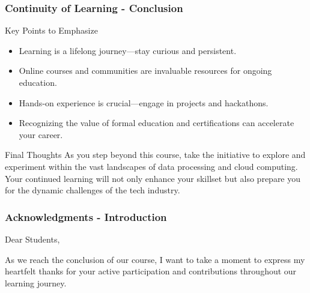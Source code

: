 \documentclass[aspectratio=169]{beamer}
\begin{document}
\begin{frame}[fragile]
    \frametitle{Continuity of Learning - Conclusion}
    \begin{block}{Key Points to Emphasize}
        \begin{itemize}
            \item Learning is a lifelong journey—stay curious and persistent.
            \item Online courses and communities are invaluable resources for ongoing education.
            \item Hands-on experience is crucial—engage in projects and hackathons.
            \item Recognizing the value of formal education and certifications can accelerate your career.
        \end{itemize}
    \end{block}
    \begin{block}{Final Thoughts}
        As you step beyond this course, take the initiative to explore and experiment within the vast landscapes of data processing and cloud computing. Your continued learning will not only enhance your skillset but also prepare you for the dynamic challenges of the tech industry.
    \end{block}
\end{frame}

\begin{frame}[fragile]
    \frametitle{Acknowledgments - Introduction}
    Dear Students,

    As we reach the conclusion of our course, I want to take a moment to express my heartfelt thanks for your active participation and contributions throughout our learning journey.
\end{frame}
\end{document}

